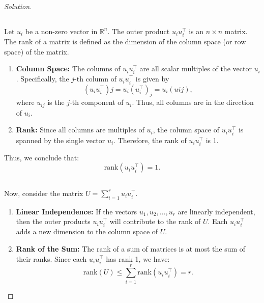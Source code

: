 \documentclass[12pt]{article}
\newenvironment{solution}{\begin{proof}[Solution]}{\end{proof}}
\begin{document}
    \begin{solution}
    \subsection*{}
    
    Let \( u_i \) be a non-zero vector in \( \mathbb{R}^n \). The outer product \( u_i u_i^\top \) is an \( n \times n \) matrix. The rank of a matrix is defined as the dimension of the column space (or row space) of the matrix.
    
    \begin{enumerate}
        \item \textbf{Column Space:} The columns of \( u_i u_i^\top \) are all scalar multiples of the vector \( u_i \). Specifically, the \( j \)-th column of \( u_i u_i^\top \) is given by 
        \[
        (u_i u_i^\top)j = u_i (u_i^\top)_j = u_i (u{ij}),
        \]
        where \( u_{ij} \) is the \( j \)-th component of \( u_i \). Thus, all columns are in the direction of \( u_i \).
    
        \item \textbf{Rank:} Since all columns are multiples of \( u_i \), the column space of \( u_i u_i^\top \) is spanned by the single vector \( u_i \). Therefore, the rank of \( u_i u_i^\top \) is 1.
    \end{enumerate}
    
    Thus, we conclude that:
    \[
    \text{rank}(u_i u_i^\top) = 1.
    \]
    
    \subsection*{}
    
    Now, consider the matrix \( U = \sum_{i=1}^r u_i u_i^\top \).
    
    \begin{enumerate}
        \item \textbf{Linear Independence:} If the vectors \( u_1, u_2, \ldots, u_r \) are linearly independent, then the outer products \( u_i u_i^\top \) will contribute to the rank of \( U \). Each \( u_i u_i^\top \) adds a new dimension to the column space of \( U \).
    
        \item \textbf{Rank of the Sum:} The rank of a sum of matrices is at most the sum of their ranks. Since each \( u_i u_i^\top \) has rank 1, we have:
        \[
        \text{rank}(U) \leq \sum_{i=1}^r \text{rank}(u_i u_i^\top) = r.
        \]
    

\end{enumerate}
\end{solution}
\end{document}

